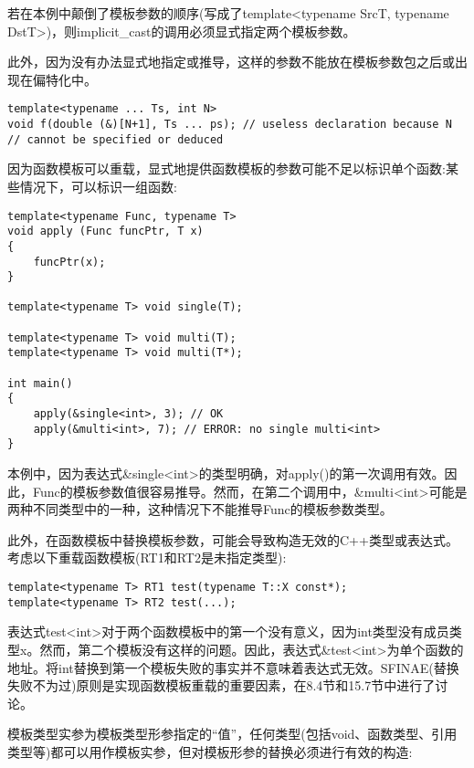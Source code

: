 若在本例中颠倒了模板参数的顺序(写成了template<typename SrcT, typename DstT>)，则implicit\_cast的调用必须显式指定两个模板参数。

此外，因为没有办法显式地指定或推导，这样的参数不能放在模板参数包之后或出现在偏特化中。

\begin{lstlisting}[style=styleCXX]
template<typename ... Ts, int N>
void f(double (&)[N+1], Ts ... ps); // useless declaration because N
// cannot be specified or deduced
\end{lstlisting}

因为函数模板可以重载，显式地提供函数模板的参数可能不足以标识单个函数:某些情况下，可以标识一组函数:

\begin{lstlisting}[style=styleCXX]
template<typename Func, typename T>
void apply (Func funcPtr, T x)
{
	funcPtr(x);
}

template<typename T> void single(T);

template<typename T> void multi(T);
template<typename T> void multi(T*);

int main()
{
	apply(&single<int>, 3); // OK
	apply(&multi<int>, 7); // ERROR: no single multi<int>
}
\end{lstlisting}

本例中，因为表达式\&single<int>的类型明确，对apply()的第一次调用有效。因此，Func的模板参数值很容易推导。然而，在第二个调用中，\&multi<int>可能是两种不同类型中的一种，这种情况下不能推导Func的模板参数类型。

此外，在函数模板中替换模板参数，可能会导致构造无效的C++类型或表达式。考虑以下重载函数模板(RT1和RT2是未指定类型):

\begin{lstlisting}[style=styleCXX]
template<typename T> RT1 test(typename T::X const*);
template<typename T> RT2 test(...);
\end{lstlisting}

表达式test<int>对于两个函数模板中的第一个没有意义，因为int类型没有成员类型x。然而，第二个模板没有这样的问题。因此，表达式\&test<int>为单个函数的地址。将int替换到第一个模板失败的事实并不意味着表达式无效。SFINAE(替换失败不为过)原则是实现函数模板重载的重要因素，在8.4节和15.7节中进行了讨论。


模板类型实参为模板类型形参指定的“值”，任何类型(包括void、函数类型、引用类型等)都可以用作模板实参，但对模板形参的替换必须进行有效的构造:


